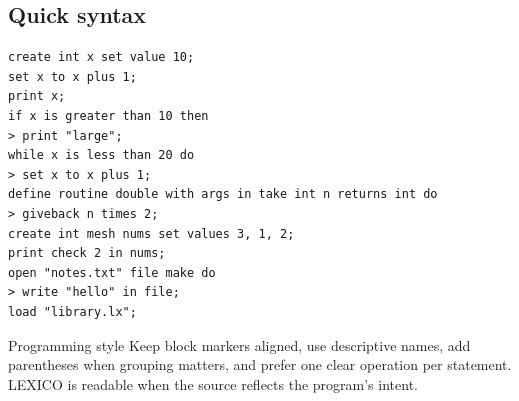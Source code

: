 \documentclass[10.5pt,a4paper]{article}
\begin{document}
\subsection{Quick syntax}
\begin{lstlisting}
create int x set value 10;
set x to x plus 1;
print x;
if x is greater than 10 then
> print "large";
while x is less than 20 do
> set x to x plus 1;
define routine double with args in take int n returns int do
> giveback n times 2;
create int mesh nums set values 3, 1, 2;
print check 2 in nums;
open "notes.txt" file make do
> write "hello" in file;
load "library.lx";
\end{lstlisting}
\begin{tipbox}{Programming style}
Keep block markers aligned, use descriptive names, add parentheses when grouping matters, and prefer one clear operation per statement. LEXICO is readable when the source reflects the program's intent.
\end{tipbox}
\end{document}
